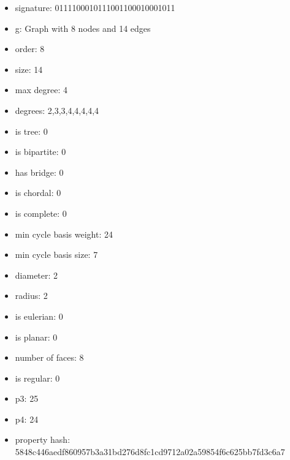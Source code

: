 \begin{itemize}
\item signature: 0111100010111001100010001011
\item g: Graph with 8 nodes and 14 edges
\item order: 8
\item size: 14
\item max degree: 4
\item degrees: 2,3,3,4,4,4,4,4
\item is tree: 0
\item is bipartite: 0
\item has bridge: 0
\item is chordal: 0
\item is complete: 0
\item min cycle basis weight: 24
\item min cycle basis size: 7
\item diameter: 2
\item radius: 2
\item is eulerian: 0
\item is planar: 0
\item number of faces: 8
\item is regular: 0
\item p3: 25
\item p4: 24
\item property hash: 5848c446aedf860957b3a31bd276d8fc1cd9712a02a59854f6c625bb7fd3c6a7
\end{itemize}
\newpage
\begin{figure}
\end{figure}
